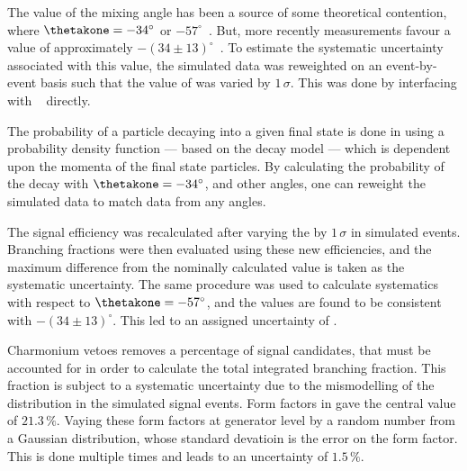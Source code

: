 The value of the mixing angle \thetakone has been a source of some theoretical contention, where
$\thetakone=-34^\circ$ or
$-57^\circ$~\cite{PhysRevD.47.1252,Tayduganov:2011ui,Hatanaka:2008xj,Cheng:2011pb,Divotgey:2013jba,Cheng:2013cwa}.
But, more recently measurements favour a value of approximately
$-(34\pm13)^\circ$~\cite{Hatanaka:2008xj,Cheng:2011pb,Divotgey:2013jba,Cheng:2013cwa}.
To estimate the systematic uncertainty associated with this value, the simulated data was
reweighted on an event-by-event basis such that the value of \thetakone was varied by $1\,\sigma$.
This was done by interfacing with \evtgen~\cite{Lange:2001uf} directly.

The probability of a particle decaying into a given final state is done in \evtgen using
a probability density function --- based on the decay model --- which is
dependent upon the momenta of the final state particles.
By calculating the probability of the decay with $\thetakone=-34^\circ$, and other angles, one can
reweight the simulated data to match data from any angles.

The signal efficiency was recalculated after varying the \thetakone by $1\,\sigma$ in simulated
 events.
Branching fractions were then evaluated using these new efficiencies, and the maximum difference
from the nominally calculated value is taken as the systematic uncertainty.
The same procedure was used to calculate systematics with respect to $\thetakone=-57^\circ$, and
the values are found to be consistent with $-(34\pm13)^\circ$.
This led to an assigned uncertainty of
.

Charmonium vetoes removes a percentage of signal candidates, that must be accounted for in order to
calculate the total integrated branching fraction.
This fraction is subject to a systematic uncertainty due to the mismodelling of the \qsq
distribution in the simulated signal events.
Form factors in  gave the central value of $21.3\,\%$.
Vaying these form factors at generator level by a random number from a Gaussian distribution, whose
standard devatioin is the error on the form factor.
This is done multiple times and leads to an uncertainty of $1.5\,\%$.




